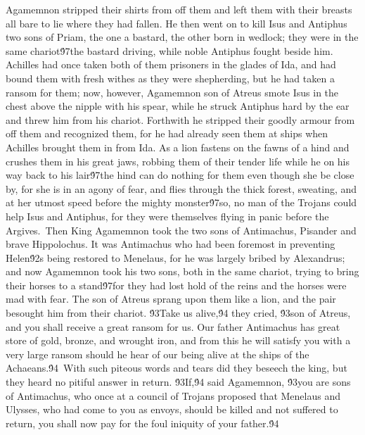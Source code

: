 {Agamemnon stripped their shirts from off them and left them with their breasts all bare to lie where they had fallen. He then went on to kill Isus and Antiphus two sons of Priam, the one a bastard, the other born in wedlock; they were in the same chariot\'97the bastard driving, while noble Antiphus fought beside him. Achilles had once taken both of them prisoners in the glades of Ida, and had bound them with fresh withes as they were shepherding, but he had taken a ransom for them; now, however, Agamemnon son of Atreus smote Isus in the chest above the nipple with his spear, while he struck Antiphus hard by the ear and threw him from his chariot. Forthwith he stripped their goodly armour from off them and recognized them, for he had already seen them at ships when Achilles brought them in from Ida. As a lion fastens on the fawns of a hind and crushes them in his great jaws, robbing them of their tender life while he on his way back to his lair\'97the hind can do nothing for them even though she be close by, for she is in an agony of fear, and flies through the thick forest, sweating, and at her utmost speed before the mighty monster\'97so, no man of the Trojans could help Isus and Antiphus, for they were themselves flying in panic before the Argives.\
Then King Agamemnon took the two sons of Antimachus, Pisander and brave Hippolochus. It was Antimachus who had been foremost in preventing Helen\'92s being restored to Menelaus, for he was largely bribed by Alexandrus; and now Agamemnon took his two sons, both in the same chariot, trying to bring their horses to a stand\'97for they had lost hold of the reins and the horses were mad with fear. The son of Atreus sprang upon them like a lion, and the pair besought him from their chariot. \'93Take us alive,\'94 they cried, \'93son of Atreus, and you shall receive a great ransom for us. Our father Antimachus has great store of gold, bronze, and wrought iron, and from this he will satisfy you with a very large ransom should he hear of our being alive at the ships of the Achaeans.\'94\
With such piteous words and tears did they beseech the king, but they heard no pitiful answer in return. \'93If,\'94 said Agamemnon, \'93you are sons of Antimachus, who once at a council of Trojans proposed that Menelaus and Ulysses, who had come to you as envoys, should be killed and not suffered to return, you shall now pay for the foul iniquity of your father.\'94\
}
